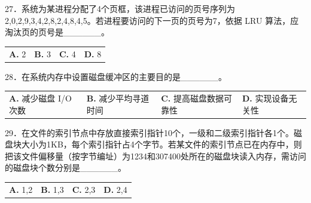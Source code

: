 \documentclass[UTF8,11pt]{ctexart}
\begin{document}
27．系统为某进程分配了4个页框，该进程已访问的页号序列为2,0,2,9,3,4,2,8,2,4,8,4,5。若进程要访问的下一页的页号为7，依据 LRU 算法，应淘汰页的页号是\_\_\_\_\_\_。


\begin{center}\begin{tabular}{>{\raggedright\arraybackslash}p{\dimexpr(\linewidth-8\tabcolsep)/4\relax}>{\raggedright\arraybackslash}p{\dimexpr(\linewidth-8\tabcolsep)/4\relax}>{\raggedright\arraybackslash}p{\dimexpr(\linewidth-8\tabcolsep)/4\relax}>{\raggedright\arraybackslash}p{\dimexpr(\linewidth-8\tabcolsep)/4\relax}}
\textbf{A.} 2 & \textbf{B.} 3 & \textbf{C.} 4 & \textbf{D.} 8\\[.35em]\end{tabular}\end{center}

28．在系统内存中设置磁盘缓冲区的主要目的是\_\_\_\_\_\_。


\begin{center}\begin{tabular}{>{\raggedright\arraybackslash}p{\dimexpr(\linewidth-8\tabcolsep)/4\relax}>{\raggedright\arraybackslash}p{\dimexpr(\linewidth-8\tabcolsep)/4\relax}>{\raggedright\arraybackslash}p{\dimexpr(\linewidth-8\tabcolsep)/4\relax}>{\raggedright\arraybackslash}p{\dimexpr(\linewidth-8\tabcolsep)/4\relax}}
\textbf{A.} 减少磁盘 I/O 次数 & \textbf{B.} 减少平均寻道时间 & \textbf{C.} 提高磁盘数据可靠性 & \textbf{D.} 实现设备无关性\\[.35em]\end{tabular}\end{center}

29．在文件的索引节点中存放直接索引指针10个，一级和二级索引指针各1个。磁盘块大小为1KB，每个索引指针占4个字节。若某文件的索引节点已在内存中，则把该文件偏移量（按字节编址）为1234和307400处所在的磁盘块读入内存，需访问的磁盘块个数分别是\_\_\_\_\_\_。


\begin{center}\begin{tabular}{>{\raggedright\arraybackslash}p{\dimexpr(\linewidth-8\tabcolsep)/4\relax}>{\raggedright\arraybackslash}p{\dimexpr(\linewidth-8\tabcolsep)/4\relax}>{\raggedright\arraybackslash}p{\dimexpr(\linewidth-8\tabcolsep)/4\relax}>{\raggedright\arraybackslash}p{\dimexpr(\linewidth-8\tabcolsep)/4\relax}}
\textbf{A.} 1,2 & \textbf{B.} 1,3 & \textbf{C.} 2,3 & \textbf{D.} 2,4\\[.35em]\end{tabular}\end{center}
\end{document}

